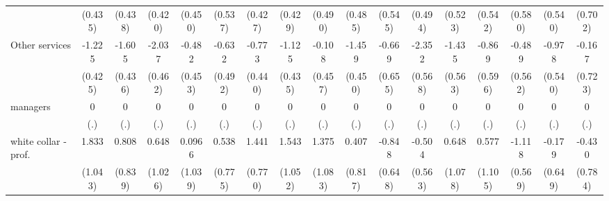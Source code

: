 {\begin{tabular}{l*{16}{c}}
                    &     (0.435)         &     (0.438)         &     (0.420)         &     (0.450)         &     (0.537)         &     (0.427)         &     (0.429)         &     (0.490)         &     (0.485)         &     (0.545)         &     (0.494)         &     (0.523)         &     (0.542)         &     (0.580)         &     (0.540)         &     (0.702)         \\
[1em]
Other services      &      -1.225\sym{**} &      -1.605\sym{***}&      -2.037\sym{***}&      -0.482         &      -0.632         &      -0.773         &      -1.125\sym{**} &      -0.108         &      -1.459\sym{**} &      -0.669         &      -2.352\sym{***}&      -1.435\sym{*}  &      -0.869         &      -0.489         &      -0.978         &      -0.167         \\
                    &     (0.425)         &     (0.436)         &     (0.462)         &     (0.453)         &     (0.492)         &     (0.440)         &     (0.435)         &     (0.457)         &     (0.450)         &     (0.655)         &     (0.568)         &     (0.563)         &     (0.596)         &     (0.562)         &     (0.540)         &     (0.723)         \\
[1em]
managers            &           0         &           0         &           0         &           0         &           0         &           0         &           0         &           0         &           0         &           0         &           0         &           0         &           0         &           0         &           0         &           0         \\
                    &         (.)         &         (.)         &         (.)         &         (.)         &         (.)         &         (.)         &         (.)         &         (.)         &         (.)         &         (.)         &         (.)         &         (.)         &         (.)         &         (.)         &         (.)         &         (.)         \\
[1em]
white collar - prof.&       1.833         &       0.808         &       0.648         &      0.0966         &       0.538         &       1.441         &       1.543         &       1.375         &       0.407         &      -0.848         &      -0.504         &       0.648         &       0.577         &      -1.118\sym{*}  &      -0.179         &      -0.430         \\
                    &     (1.043)         &     (0.839)         &     (1.026)         &     (1.039)         &     (0.775)         &     (0.770)         &     (1.052)         &     (1.083)         &     (0.817)         &     (0.648)         &     (0.563)         &     (1.078)         &     (1.105)         &     (0.569)         &     (0.649)         &     (0.784)         \\

\end{tabular}}
